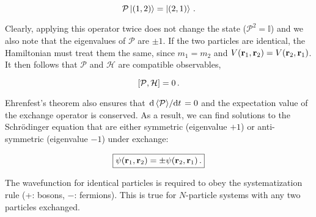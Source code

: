 \documentclass[12pt, titlepage]{article}
\newcommand{\exv}[1]{\left\langle #1 \right\rangle}
\begin{document}
\begin{equation}
\mathcal{P}\ket{(1,2)} = \ket{(2,1)} \,.
\end{equation}

Clearly, applying this operator twice does not change the state ($\mathcal{P}^2 = \mathbb{I}$) and we also note that the eigenvalues of $\mathcal{P}$ are $\pm1$. If the two particles are identical, the Hamiltonian must treat them the same, since $m_1 = m_2$ and $V(\vb{r}_1,\vb{r}_2) = V(\vb{r}_2,\vb{r}_1)$. It then follows that $\mathcal{P}$ and $\mathcal{H}$ are compatible observables, 

\begin{equation}
\comm{\mathcal{P}}{\mathcal{H}} = 0 \,.
\end{equation}

Ehrenfest's theorem also ensures that $\dv*{\exv{\mathcal{P}}}{t} = 0$ and the expectation value of the exchange operator is conserved. As a result, we can find solutions to the Schrödinger equation that are either symmetric (eigenvalue $+1$) or anti-symmetric (eigenvalue $-1$) under exchange:

\begin{equation}
\boxed{ \psi(\vb{r}_1,\vb{r}_2) = \pm\psi(\vb{r}_2,\vb{r}_1) \,.}
\end{equation}

The wavefunction for identical particles is required to obey the systematization rule (+: bosons, $-$: fermions). This is true for $N$-particle systems with any two particles exchanged.
\end{document}
